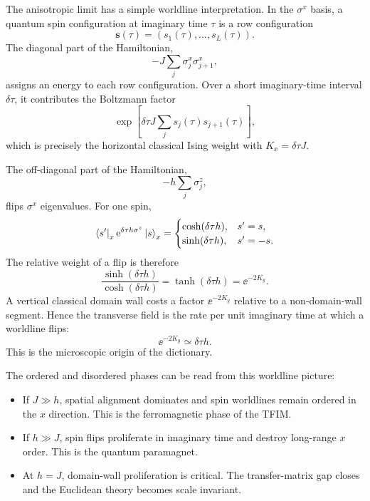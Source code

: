 The anisotropic limit has a simple worldline interpretation.  In the $\sigma^x$
basis, a quantum spin configuration at imaginary time $\tau$ is a row
configuration
\begin{equation}
    \bm{s}(\tau)=(s_1(\tau),\ldots,s_L(\tau)).
\end{equation}
The diagonal part of the Hamiltonian,
\begin{equation}
    -J\sum_j\sigma_j^x\sigma_{j+1}^x,
\end{equation}
assigns an energy to each row configuration.  Over a short imaginary-time
interval $\delta\tau$, it contributes the Boltzmann factor
\begin{equation}
\label{eq:ising-tfim-diagonal-row-weight}
    \exp\left[
        \delta\tau J\sum_j s_j(\tau)s_{j+1}(\tau)
    \right],
\end{equation}
which is precisely the horizontal classical Ising weight with
$K_x=\delta\tau J$.

The off-diagonal part of the Hamiltonian,
\begin{equation}
    -h\sum_j\sigma_j^z,
\end{equation}
flips $\sigma^x$ eigenvalues.  For one spin,
\begin{equation}
\label{eq:ising-tfim-one-site-short-time-matrix}
    \left\langle s'\right|_x\mathrm{e}^{\delta\tau h\sigma^z}\left|s\right\rangle_x
    =
    \begin{cases}
    \cosh(\delta\tau h), & s'=s,\\
    \sinh(\delta\tau h), & s'=-s.
    \end{cases}
\end{equation}
The relative weight of a flip is therefore
\begin{equation}
\label{eq:ising-tfim-flip-weight}
    \frac{\sinh(\delta\tau h)}{\cosh(\delta\tau h)}
    =
    \tanh(\delta\tau h)
    =
    \ee^{-2K_y}.
\end{equation}
A vertical classical domain wall costs a factor $\ee^{-2K_y}$ relative to a
non-domain-wall segment.  Hence the transverse field is the rate per unit
imaginary time at which a worldline flips:
\begin{equation}
\label{eq:ising-tfim-transverse-field-as-flip-rate}
    \ee^{-2K_y}\simeq\delta\tau h .
\end{equation}
This is the microscopic origin of the dictionary.

The ordered and disordered phases can be read from this worldline picture:
\begin{itemize}[leftmargin=2.0em]
    \item If $J\gg h$, spatial alignment dominates and spin worldlines remain
    ordered in the $x$ direction.  This is the ferromagnetic phase of the TFIM.
    \item If $h\gg J$, spin flips proliferate in imaginary time and destroy
    long-range $x$ order.  This is the quantum paramagnet.
    \item At $h=J$, domain-wall proliferation is critical.  The transfer-matrix
    gap closes and the Euclidean theory becomes scale invariant.
\end{itemize}

